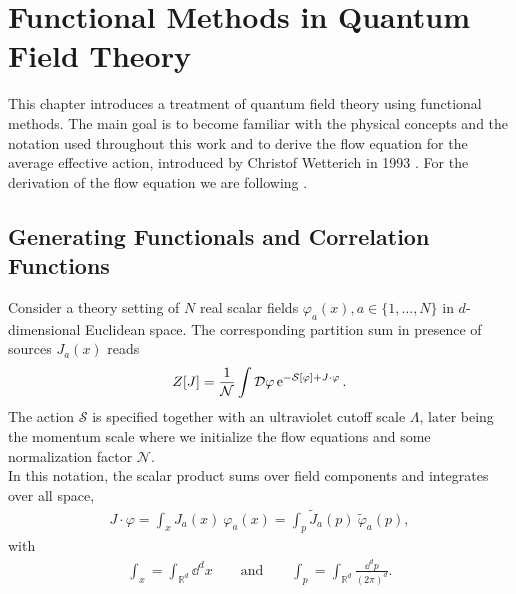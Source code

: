 \chapter{Functional Methods in Quantum Field Theory}\label{chap:QFT}
This chapter introduces a treatment of quantum field theory using functional methods. The main goal is to become familiar with the physical concepts and the notation used throughout this work and to derive the flow equation for the average effective action, introduced by Christof Wetterich in 1993 \cite{Wetterich1992}. 
For the derivation of the flow equation we are following \cite{Gies2006, PawlowskiNPgaugeLecture}.

\section{Generating Functionals and Correlation Functions}
Consider a theory setting of $N$ real scalar fields $\varphi_a(x), a \in \{1,\dots,N\}$ in $d$-dimensional Euclidean space. The corresponding partition sum in presence of sources $J_a(x)$ reads
\begin{align}
	Z[J] = \frac{1}{\mathcal{N}} \int \mathcal{D}\varphi \operatorname{e}^{-\mathcal{S}[\varphi] + J\cdot\varphi}.
	\label{eqn:partition}
\end{align}
The action $\mathcal{S}$ is specified together with an ultraviolet cutoff scale $\Lambda$, later being the momentum scale where we initialize the flow equations and some normalization factor $\mathcal{N}$.\\
In this notation, the scalar product sums over field components and integrates over all space,
\begin{align}
	J\cdot\varphi = \int_x J_a(x) \ \varphi_a(x) = \int_p \tilde{J}_a(p) \ \tilde{\varphi}_a(p),
\end{align}
with
\begin{align}
\int_x = \int_{\mathbb{R}^d} \dd^d x \qquad \text{and} \qquad \int_p = \int_{\mathbb{R}^d} \frac{\dd^d p}{(2\pi)^d}.	
\end{align}


